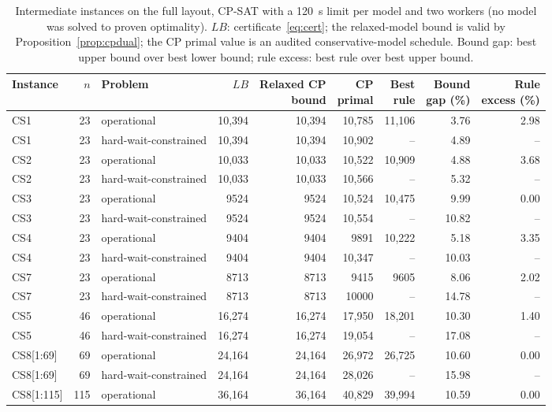 \begin{table}[tbp]
\caption{Intermediate instances on the full layout, CP-SAT with a 120~s limit per model and two workers (no model was solved to proven optimality). $LB$: certificate~\eqref{eq:cert}; the relaxed-model bound is valid by Proposition~\ref{prop:cpdual}; the CP primal value is an audited conservative-model schedule. Bound gap: best upper bound over best lower bound; rule excess: best rule over best upper bound.\label{tab:intermediate}}
\centering
\footnotesize
\setlength{\tabcolsep}{3pt}
\begin{tabular*}{\textwidth}{@{\extracolsep{\fill}}lrlrrrrrr@{}}
\toprule
Instance & $n$ & Problem & $LB$ & \shortstack{Relaxed CP\\bound} & \shortstack{CP\\primal} & \shortstack{Best\\rule} & \shortstack{Bound\\gap (\%)} & \shortstack{Rule\\excess (\%)}\\
\midrule
CS1 & 23 & operational & 10,394 & 10,394 & 10,785 & 11,106 & 3.76 & 2.98\\
CS1 & 23 & hard-wait-constrained & 10,394 & 10,394 & 10,902 & -- & 4.89 & --\\
CS2 & 23 & operational & 10,033 & 10,033 & 10,522 & 10,909 & 4.88 & 3.68\\
CS2 & 23 & hard-wait-constrained & 10,033 & 10,033 & 10,566 & -- & 5.32 & --\\
CS3 & 23 & operational & 9524 & 9524 & 10,524 & 10,475 & 9.99 & 0.00\\
CS3 & 23 & hard-wait-constrained & 9524 & 9524 & 10,554 & -- & 10.82 & --\\
CS4 & 23 & operational & 9404 & 9404 & 9891 & 10,222 & 5.18 & 3.35\\
CS4 & 23 & hard-wait-constrained & 9404 & 9404 & 10,347 & -- & 10.03 & --\\
CS7 & 23 & operational & 8713 & 8713 & 9415 & 9605 & 8.06 & 2.02\\
CS7 & 23 & hard-wait-constrained & 8713 & 8713 & 10000 & -- & 14.78 & --\\
CS5 & 46 & operational & 16,274 & 16,274 & 17,950 & 18,201 & 10.30 & 1.40\\
CS5 & 46 & hard-wait-constrained & 16,274 & 16,274 & 19,054 & -- & 17.08 & --\\
CS8[1:69] & 69 & operational & 24,164 & 24,164 & 26,972 & 26,725 & 10.60 & 0.00\\
CS8[1:69] & 69 & hard-wait-constrained & 24,164 & 24,164 & 28,026 & -- & 15.98 & --\\
CS8[1:115] & 115 & operational & 36,164 & 36,164 & 40,829 & 39,994 & 10.59 & 0.00\\
\bottomrule
\end{tabular*}
\end{table}
